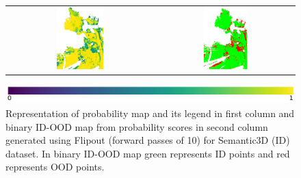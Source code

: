 \begin{figure}[h!]
\begin{tabular}{cc}
            \includegraphics[width=0.33\textwidth, height=0.18\textheight]{images/ood_imgs/fout_sem3d/fout_prob_3.pdf}& 
            \includegraphics[width=0.33\textwidth, height=0.18\textheight]{images/ood_imgs/fout_sem3d/fout_ood_auroc_3.pdf}\\
        \end{tabular}
        \includegraphics[scale=0.45]{images/prob_legend.pdf}
        \caption{Representation of probability map and its legend in first column and binary ID-OOD map from probability scores in second column generated using Flipout (forward passes of 10) for Semantic3D (ID) dataset. In binary ID-OOD map green represents ID points and red represents OOD points.}
        \label{fig:fout_ood_auroc_sem3d_prob}
    \end{figure}
